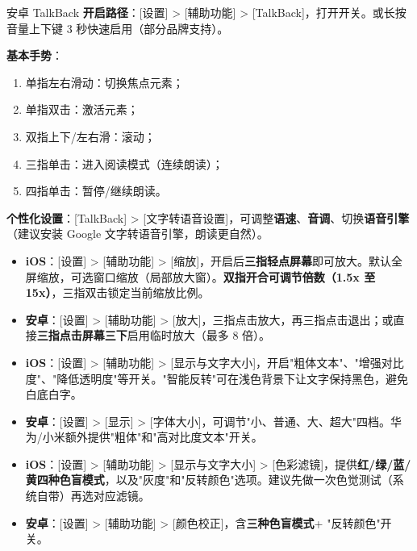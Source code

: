 \begin{tcbinfo}{安卓 TalkBack}
\textbf{开启路径}：[设置] > [辅助功能] > [TalkBack]，打开开关。或长按音量上下键 3 秒快速启用（部分品牌支持）。

\textbf{基本手势}：

\begin{enumerate}
  \item 单指左右滑动：切换焦点元素；
  \item 单指双击：激活元素；
  \item 双指上下/左右滑：滚动；
  \item 三指单击：进入阅读模式（连续朗读）；
  \item 四指单击：暂停/继续朗读。
\end{enumerate}

\textbf{个性化设置}：[TalkBack] > [文字转语音设置]，可调整\textbf{语速}、\textbf{音调}、切换\textbf{语音引擎}（建议安装 Google 文字转语音引擎，朗读更自然）。

\end{tcbinfo}



\begin{itemize}
  \item \textbf{iOS}：[设置] > [辅助功能] > [缩放]，开启后\textbf{三指轻点屏幕}即可放大。默认全屏缩放，可选窗口缩放（局部放大窗）。\textbf{双指开合可调节倍数（1.5x 至 15x）}，三指双击锁定当前缩放比例。
  \item \textbf{安卓}：[设置] > [辅助功能] > [放大]，三指点击放大，再三指点击退出；或直接\textbf{三指点击屏幕三下}启用临时放大（最多 8 倍）。
\end{itemize}


\begin{itemize}
  \item \textbf{iOS}：[设置] > [辅助功能] > [显示与文字大小]，开启"粗体文本"、"增强对比度"、"降低透明度"等开关。"智能反转"可在浅色背景下让文字保持黑色，避免白底白字。
  \item \textbf{安卓}：[设置] > [显示] > [字体大小]，可调节"小、普通、大、超大"四档。华为/小米额外提供"粗体"和"高对比度文本"开关。
\end{itemize}


\begin{itemize}
  \item \textbf{iOS}：[设置] > [辅助功能] > [显示与文字大小] > [色彩滤镜]，提供\textbf{红/绿/蓝/黄四种色盲模式}，以及"灰度"和"反转颜色"选项。建议先做一次色觉测试（系统自带）再选对应滤镜。
  \item \textbf{安卓}：[设置] > [辅助功能] > [颜色校正]，含\textbf{三种色盲模式}+ "反转颜色"开关。
\end{itemize}

